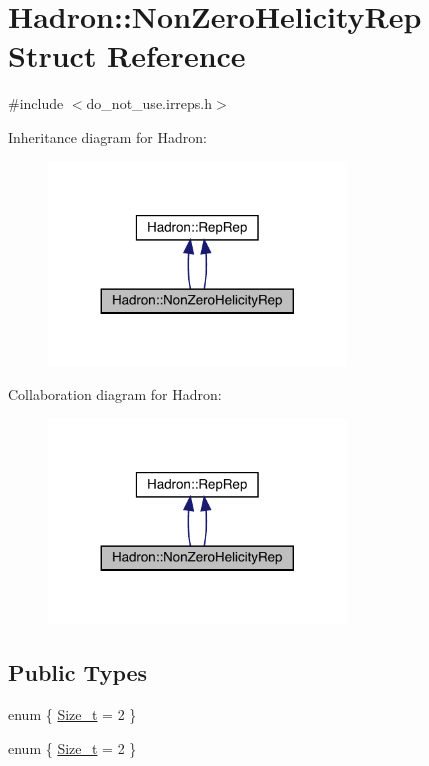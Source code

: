 \hypertarget{structHadron_1_1NonZeroHelicityRep}{}\section{Hadron\+:\+:Non\+Zero\+Helicity\+Rep Struct Reference}
\label{structHadron_1_1NonZeroHelicityRep}


{\ttfamily \#include $<$do\+\_\+not\+\_\+use.\+irreps.\+h$>$}



Inheritance diagram for Hadron\+:
\nopagebreak
\begin{figure}[H]
\begin{center}
\leavevmode
\includegraphics[width=224pt]{d4/d74/structHadron_1_1NonZeroHelicityRep__inherit__graph}
\end{center}
\end{figure}


Collaboration diagram for Hadron\+:
\nopagebreak
\begin{figure}[H]
\begin{center}
\leavevmode
\includegraphics[width=224pt]{d3/da9/structHadron_1_1NonZeroHelicityRep__coll__graph}
\end{center}
\end{figure}
\subsection*{Public Types}
\begin{DoxyCompactItemize}
\item 
enum \{ \mbox{\hyperlink{structHadron_1_1NonZeroHelicityRep_a6541fdf7de0001acfe09785a544da322a338746418526945503f92c6286bcc416}{Size\+\_\+t}} = 2
 \}
\item 
enum \{ \mbox{\hyperlink{structHadron_1_1NonZeroHelicityRep_a6541fdf7de0001acfe09785a544da322a338746418526945503f92c6286bcc416}{Size\+\_\+t}} = 2
 \}
\end{DoxyCompactItemize}
